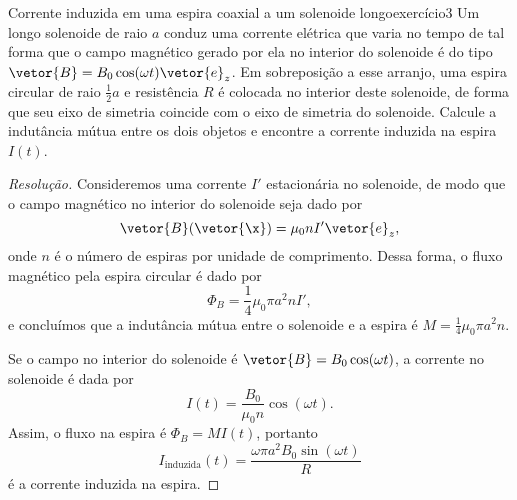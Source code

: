 \begin{exercício}{Corrente induzida em uma espira coaxial a um solenoide longo}{exercício3}
    Um longo solenoide de raio \(a\) conduz uma corrente elétrica que varia no tempo de tal forma que o campo magnético gerado por ela no interior do solenoide é do tipo \(\vetor{B} = B_0 \cos(\omega t) \vetor{e}_z\). Em sobreposição a esse arranjo, uma espira circular de raio \(\frac12a\) e resistência \(R\) é colocada no interior deste solenoide, de forma que seu eixo de simetria coincide com o eixo de simetria do solenoide. Calcule a indutância mútua entre os dois objetos e encontre a corrente induzida na espira \(I(t)\).
\end{exercício}
\begin{proof}[Resolução]
    Consideremos uma corrente \(I'\) estacionária no solenoide, de modo que o campo magnético no interior do solenoide seja dado por
    \begin{equation*}
        \vetor{B}(\vetor{\x}) = \mu_0 n I' \vetor{e}_z,
    \end{equation*}
    onde \(n\) é o número de espiras por unidade de comprimento. Dessa forma, o fluxo magnético pela espira circular é dado por
    \begin{equation*}
        \Phi_B = \frac14\mu_0 \pi a^2 n I',
    \end{equation*}
    e concluímos que a indutância mútua entre o solenoide e a espira é \(M = \frac14\mu_0 \pi a^2 n\).

    Se o campo no interior do solenoide é \(\vetor{B} = B_0 \cos(\omega t)\), a corrente no solenoide é dada por
    \begin{equation*}
        I(t) = \frac{B_0}{\mu_0 n}\cos(\omega t).
    \end{equation*}
    Assim, o fluxo na espira é \(\Phi_B = M I(t)\), portanto
    \begin{equation*}
        I_\mathrm{induzida}(t) = \frac{\omega\pi a^2 B_0 \sin(\omega t)}{R}
    \end{equation*}
    é a corrente induzida na espira.
\end{proof}
